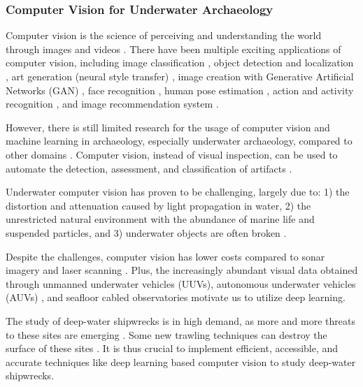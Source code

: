 \documentclass[a4paper, 11pt, oneside]{article}
\begin{document}
\subsubsection{Computer Vision for Underwater Archaeology}

\label{sec:cvForUnderwater}

Computer vision is the science of perceiving and understanding the world through images and videos \cite{elgendy2020deep}.
There have been multiple exciting applications of computer vision, including image classification \cite{rawat2017deep},
object detection and localization \cite{zhao2019object,liu2020deep}, art generation (neural style transfer)
\cite{jing2019neural}, image creation with Generative Artificial Networks (GAN) \cite{goodfellow2014generative},
face recognition \cite{parkhi2015deep}, human pose estimation \cite{toshev2014deeppose}, action and activity recognition
\cite{poppe2010survey}, and image recommendation system \cite{niu2018neural}.

However, there is still limited research for the usage of computer vision and machine learning in archaeology,
especially underwater archaeology, compared to other domains \cite{maaten2007computer, qin2015underwater}.
Computer vision, instead of visual inspection, can be used to automate the detection, assessment, and classification
of artifacts \cite{maaten2007computer}.

Underwater computer vision has proven to be challenging, largely due to: 1) the distortion and attenuation caused by
light propagation in water, 2) the unrestricted natural environment with the abundance of marine life and suspended
particles, and 3) underwater objects are often broken
\cite{qin2015underwater, rizzini2015investigation, lu2017underwater, mccarthy20193d}.

Despite the challenges, computer vision has lower costs \cite{rizzini2015investigation} compared to sonar imagery
\cite{abu2019statistically} and laser scanning \cite{gordon1992use}. Plus, the increasingly abundant visual data obtained
through unmanned underwater vehicles (UUVs), autonomous underwater vehicles (AUVs)
\cite{lu2017underwater, moniruzzaman2017deep}, and seafloor cabled observatories \cite{qin2015underwater} motivate us
to utilize deep learning.

The study of deep-water shipwrecks is in high demand, as more and more threats to these sites are emerging
\cite{drap2015underwater}. Some new trawling techniques can destroy the surface of these sites \cite{drap2015underwater}.
It is thus crucial to implement efficient, accessible, and accurate techniques like deep learning based computer vision to
study deep-water shipwrecks.
\end{document}
